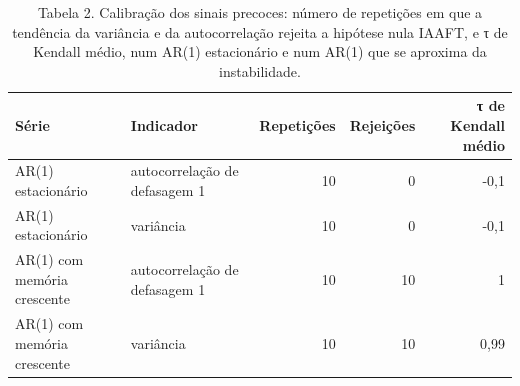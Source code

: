 \begin{table}
\caption{Tabela 2. Calibração dos sinais precoces: número de repetições em que a tendência da variância e da autocorrelação rejeita a hipótese nula IAAFT, e τ de Kendall médio, num AR(1) estacionário e num AR(1) que se aproxima da instabilidade.}
\label{tab:05_validacao_metodos::ews_calibracao}
\begin{tabular}{llrrr}
\toprule
Série & Indicador & Repetições & Rejeições & τ de Kendall médio \\
\midrule
AR(1) estacionário & autocorrelação de defasagem 1 & 10 & 0 & -0,1 \\
AR(1) estacionário & variância & 10 & 0 & -0,1 \\
AR(1) com memória crescente & autocorrelação de defasagem 1 & 10 & 10 & 1 \\
AR(1) com memória crescente & variância & 10 & 10 & 0,99 \\
\bottomrule
\end{tabular}
\end{table}
